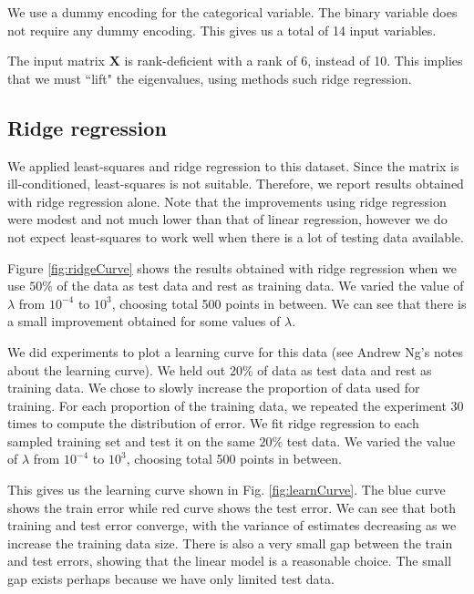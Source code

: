 \documentclass{article} %
\begin{document}
We use a dummy encoding for the categorical variable. The binary variable does not require any dummy encoding. This gives us a total of 14 input variables.

The input matrix $\mathbf{X}$ is rank-deficient with a rank of 6, instead of 10. This implies that we must ``lift" the eigenvalues, using methods such ridge regression.

\begin{figure}[!t]
\center
{}
\hfill
{}
\caption{}
\end{figure}

\subsection{Ridge regression}
We applied least-squares and ridge regression to this dataset. Since the matrix is ill-conditioned, least-squares is not suitable. Therefore, we report results obtained with ridge regression alone. Note that the improvements using ridge regression were modest and not much lower than that of linear regression, however we do not expect least-squares to work well when there is a lot of testing data available. 

Figure \ref{fig:ridgeCurve} shows the results obtained with ridge regression when we use $50\%$ of the data as test data and rest as training data. We varied the value of $\lambda$ from $10^{-4}$ to $10^3$, choosing total 500 points in between. We can see that there is a small improvement obtained for some values of $\lambda$.

We did experiments to plot a learning curve for this data (see Andrew Ng's notes about the learning curve). We held out 20\% of data as test data and rest as training data. We chose to slowly increase the proportion of data used for training. For each proportion of the training data, we repeated the experiment 30 times to compute the distribution of error. We fit ridge regression to each sampled training set and test it on the same $20\%$ test data. We varied the value of $\lambda$ from $10^{-4}$ to $10^3$, choosing total 500 points in between.

This gives us the learning curve shown in Fig. \ref{fig:learnCurve}. The blue curve shows the train error while red curve shows the test error. We can see that both training and test error converge, with the variance of estimates decreasing as we increase the training data size. There is also a very small gap between the train and test errors, showing that the linear model is a reasonable choice. The small gap exists perhaps because we have only limited test data.
\end{document}
